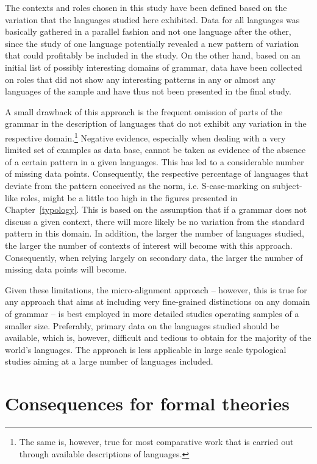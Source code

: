 The contexts and roles chosen in this study have been defined based on the variation that the languages studied here exhibited. 
Data for all languages was basically gathered in a parallel fashion and not one language after the other, since the study of one language potentially revealed a new pattern of variation that could profitably be included in the study. 
On the other hand, based on an initial list of possibly interesting domains of grammar, data have been collected on roles that did not show any interesting patterns in any or almost any languages of the sample and have thus not been presented in the final study. 

A small drawback of this approach is the frequent omission of parts of the grammar in the description of languages that do not exhibit any variation in the respective domain.\footnote{The same is, however, true for most comparative work that is carried out through available descriptions of languages.} 
Negative evidence, especially when dealing with a very limited set of examples as data base, cannot be taken as evidence of the absence of a certain pattern in a given languages. 
This has led to a considerable number of missing data points. Consequently, the respective percentage of languages that deviate from the pattern conceived as the norm, i.e. S-case-marking on subject-like roles, might be a little too high in the figures presented in Chapter~\ref{typology}. 
This is based on the assumption that if a grammar does not discuss a given context, there will more likely be no variation from the standard pattern in this domain.
In addition, the larger the number of languages studied, the larger the number of contexts of interest will become with this approach. 
Consequently, when relying largely on secondary data, the larger the number of missing data points will become. 

Given these limitations, the micro-alignment approach -- however, this is true for any approach that aims at including very fine-grained distinctions on any domain of grammar -- is best employed in more detailed studies operating samples of a smaller size. 
Preferably, primary data on the languages studied should be available, which is, however, difficult and tedious to obtain for the majority of the world's languages. 
The approach is less applicable in large scale typological studies aiming at a large number of languages included. 

\section{Consequences for formal theories}\label{consequencesformal}

